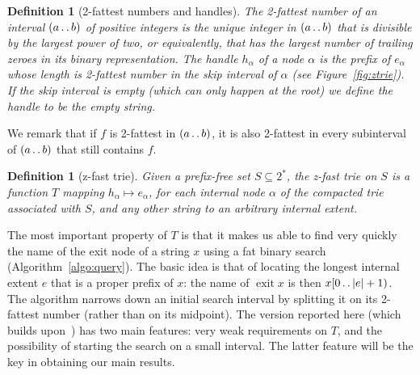 \documentclass[a4paper,11pt]{article}
\newtheorem{definition}[theorem]{Definition}
\newcommand{\?}{\mskip1.5mu}
\def\..{\,\mathpunct{\ldotp\ldotp}} %
\DeclareMathOperator{\exit}{exit}
\begin{document}
\begin{definition}[2-fattest numbers and handles] 
\label{def:twofattest}
The \emph{2-fattest number} of an interval
$(a\..b)$ of positive integers is the unique integer in $(a\..b)$ that is
divisible by the largest power of two, or equivalently, that has the largest
number of trailing zeroes in its binary representation. The \emph{handle}
$h_\alpha$ of a node $\alpha$ is the prefix of $e_\alpha$ whose length is 2-fattest number in the skip interval of $\alpha$
(see Figure~\ref{fig:ztrie}). If the skip interval is empty (which can only
happen at the root) we define the handle to be the empty string.
\end{definition}
We remark that if $f$ is 2-fattest in $(a\..b)$, it is also 2-fattest in every
subinterval of $(a\..b)$ that still contains $f$.

\begin{definition}[z-fast trie]
Given a prefix-free set $S\subseteq 2^*$, the \emph{z-fast trie on $S$} is 
a function $T$ mapping $h_\alpha \mapsto e_\alpha$, for each internal node
$\alpha$ of the compacted trie associated with $S$, and any other string to an
arbitrary internal extent.
\end{definition}

The most important property of $T$ is that it makes us able to find very quickly
the name of the exit node of a string $x$ using 
a fat binary search (Algorithm~\ref{algo:query}). The basic idea is that of locating the
longest internal extent $e$ that is a proper prefix of $x$:
the name of $\exit x$ is then $x[0\..|e|+1)$. The algorithm
narrows down an initial search interval by splitting it on its 2-fattest number (rather than on its midpoint).
The version reported here (which builds upon~\cite{BelazzouguiBoVi10}) has two main features:
very weak requirements on $T$, and the possibility of starting the search on a small interval. The
latter feature will be the key in obtaining our main results.
\end{document}
